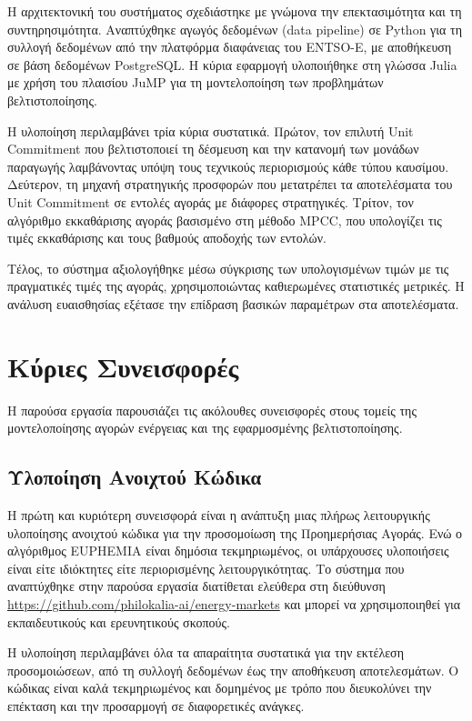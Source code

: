 Η αρχιτεκτονική του συστήματος σχεδιάστηκε με γνώμονα την επεκτασιμότητα και τη συντηρησιμότητα. Αναπτύχθηκε αγωγός δεδομένων (data pipeline) σε Python για τη συλλογή δεδομένων από την πλατφόρμα διαφάνειας του ENTSO-E, με αποθήκευση σε βάση δεδομένων PostgreSQL. Η κύρια εφαρμογή υλοποιήθηκε στη γλώσσα Julia με χρήση του πλαισίου JuMP για τη μοντελοποίηση των προβλημάτων βελτιστοποίησης.

Η υλοποίηση περιλαμβάνει τρία κύρια συστατικά. Πρώτον, τον επιλυτή Unit Commitment που βελτιστοποιεί τη δέσμευση και την κατανομή των μονάδων παραγωγής λαμβάνοντας υπόψη τους τεχνικούς περιορισμούς κάθε τύπου καυσίμου. Δεύτερον, τη μηχανή στρατηγικής προσφορών που μετατρέπει τα αποτελέσματα του Unit Commitment σε εντολές αγοράς με διάφορες στρατηγικές. Τρίτον, τον αλγόριθμο εκκαθάρισης αγοράς βασισμένο στη μέθοδο MPCC, που υπολογίζει τις τιμές εκκαθάρισης και τους βαθμούς αποδοχής των εντολών.

Τέλος, το σύστημα αξιολογήθηκε μέσω σύγκρισης των υπολογισμένων τιμών με τις πραγματικές τιμές της αγοράς, χρησιμοποιώντας καθιερωμένες στατιστικές μετρικές. Η ανάλυση ευαισθησίας εξέτασε την επίδραση βασικών παραμέτρων στα αποτελέσματα.


\section{Κύριες Συνεισφορές}
\label{sec:contributions}

Η παρούσα εργασία παρουσιάζει τις ακόλουθες συνεισφορές στους τομείς της μοντελοποίησης αγορών ενέργειας και της εφαρμοσμένης βελτιστοποίησης.

\subsection{Υλοποίηση Ανοιχτού Κώδικα}
\label{subsec:open-source-contribution}

Η πρώτη και κυριότερη συνεισφορά είναι η ανάπτυξη μιας πλήρως λειτουργικής υλοποίησης ανοιχτού κώδικα για την προσομοίωση της Προημερήσιας Αγοράς. Ενώ ο αλγόριθμος EUPHEMIA είναι δημόσια τεκμηριωμένος, οι υπάρχουσες υλοποιήσεις είναι είτε ιδιόκτητες είτε περιορισμένης λειτουργικότητας. Το σύστημα που αναπτύχθηκε στην παρούσα εργασία διατίθεται ελεύθερα στη διεύθυνση \url{https://github.com/philokalia-ai/energy-markets} και μπορεί να χρησιμοποιηθεί για εκπαιδευτικούς και ερευνητικούς σκοπούς.

Η υλοποίηση περιλαμβάνει όλα τα απαραίτητα συστατικά για την εκτέλεση προσομοιώσεων, από τη συλλογή δεδομένων έως την αποθήκευση αποτελεσμάτων. Ο κώδικας είναι καλά τεκμηριωμένος και δομημένος με τρόπο που διευκολύνει την επέκταση και την προσαρμογή σε διαφορετικές ανάγκες.

